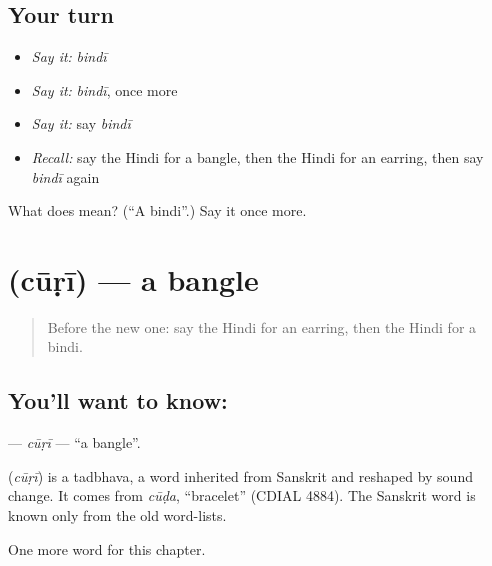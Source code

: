 \subsection*{Your turn}
\begin{itemize}
\raggedright
  \item \emph{Say it:} \emph{bindī}
  \item \emph{Say it:} \emph{bindī}, once more
  \item \emph{Say it:} say \emph{bindī}
  \item \emph{Recall:} say the Hindi for a bangle, then the Hindi for an earring, then say \emph{bindī} again
\end{itemize}

\begin{tcolorbox}[breakable,colback=teal!4,colframe=teal!35!black,title={Before you move on}]
What does  mean? (\textquotedblleft{}A bindi\textquotedblright{}.) Say it once more.
\end{tcolorbox}
\section[\texorpdfstring{\hi{चूड़ी} (cūṛī)}{चूड़ी (cūṛī)}]{ (cūṛī) — a bangle}

\label{lesson:HI-C263-curi}



\begin{quote}
Before the new one: say the Hindi for an earring, then the Hindi for a bindi.
\end{quote}

\subsection*{You'll want to know: }
\textbf{} — \emph{cūṛī} — \textquotedblleft{}a bangle\textquotedblright{}.

\begin{cousinweb}
\textbf{} (\emph{cūṛī}) is a tadbhava, a word inherited from Sanskrit and reshaped by sound change. It comes from \emph{cūḍa}, \textquotedblleft{}bracelet\textquotedblright{} (CDIAL 4884). The Sanskrit word is known only from the old word-lists.
\end{cousinweb}

\begin{grammarlens}[title={What you've built}]
One more word for this chapter.
\end{grammarlens}

